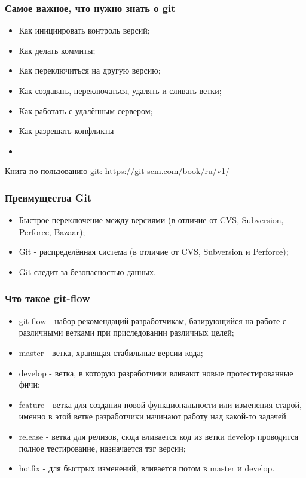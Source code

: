 \documentclass[]{beamer}
\begin{document}
\begin{frame} \frametitle{Самое важное, что нужно знать о git}
	\begin{itemize}
		\item Как инициировать контроль версий;
		\item Как делать коммиты;
		\item Как переключиться на другую версию;
		\item Как создавать, переключаться, удалять и сливать ветки;
		\item Как работать с удалённым сервером;
		\item Как разрешать конфликты
		\item[~]
	\end{itemize}
	Книга по пользованию git: \newline
	\url{https://git-scm.com/book/ru/v1/}
\end{frame}

\begin{frame} \frametitle{Преимущества Git}
	\begin{itemize}
		\item Быстрое переключение между версиями (в отличие от CVS, Subversion, Perforce, Bazaar); \newline \par
		\item Git - распределённая система (в отличие от CVS, Subversion и Perforce); \newline \par
		\item Git следит за безопасностью данных. \newline \par
	\end{itemize}
\end{frame}

\begin{frame} \frametitle{Что такое git-flow}
	\begin{itemize}
		\item git-flow - набор рекомендаций разработчикам, базирующийся на работе с различными ветками при приследовании различных целей; \newline \par
		\item master - ветка, хранящая стабильные версии кода;
		\item develop - ветка, в которую разработчики вливают новые протестированные фичи;
		\item feature - ветка для создания новой функциональности или изменения старой, именно в этой ветке разработчики начинают работу над какой-то задачей
		\item release - ветка для релизов, сюда вливается код из ветки develop проводится полное тестирование, назначается тэг версии;
		\item hotfix - для быстрых изменений, вливается потом в master и develop.
	\end{itemize}
\end{frame}
\end{document}
